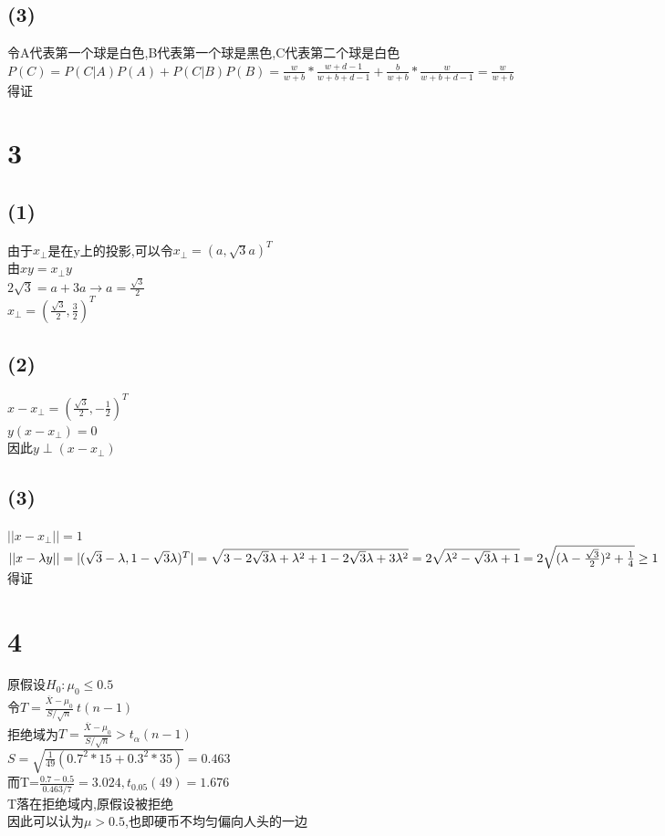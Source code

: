 \documentclass{article}
\begin{document}
\subsection*{(3)}\noindent
令A代表第一个球是白色,B代表第一个球是黑色,C代表第二个球是白色
$P(C)=P(C|A)P(A)+P(C|B)P(B)=\frac{w}{w+b}*\frac{w+d-1}{w+b+d-1}+\frac{b}{w+b}*\frac{w}{w+b+d-1}=\frac{w}{w+b}$\\
得证
\section*{3}\noindent
\subsection*{(1)}\noindent
由于$x_\perp$是在y上的投影,可以令$x_\perp=(a,\sqrt{3}a)^T$\\
由$xy=x_\perp y$\\
$2\sqrt{3}=a+3a\rightarrow a=\frac{\sqrt{3}}{2}$\\
$x_\perp=(\frac{\sqrt{3}}{2},\frac{3}{2})^T$
\subsection*{(2)}\noindent
$x-x_\perp=(\frac{\sqrt{3}}{2},-\frac{1}{2})^T$\\
$y(x-x_\perp)=0$\\
因此$y\perp(x-x_\perp)$
\subsection*{(3)}\noindent
$||x-x_\perp||=1$\\
$||x-\lambda y||=|(\sqrt{3}-\lambda,1-\sqrt{3}\lambda)^T|=\sqrt{3-2\sqrt{3}\lambda+\lambda^2+1-2\sqrt{3}\lambda+3\lambda^2}
\\=2\sqrt{\lambda^2-\sqrt{3}\lambda+1}=2\sqrt{(\lambda-\frac{\sqrt{3}}{2})^2+\frac{1}{4}}\ge 1$\\
得证
\section*{4}\noindent
原假设$H_0:\mu_0\le0.5$\\
令$T=\frac{\overline{X}-\mu_0}{S/\sqrt{n}}~t(n-1)$\\
拒绝域为$T=\frac{\overline{X}-\mu_0}{S/\sqrt{n}}>t_\alpha(n-1)$\\
$S=\sqrt{\frac{1}{49}(0.7^2*15+0.3^2*35)}=0.463$\\
而T=$\frac{0.7-0.5}{0.463/7}=3.024,t_0.05(49)=1.676$\\
T落在拒绝域内,原假设被拒绝\\
因此可以认为$\mu>0.5$,也即硬币不均匀偏向人头的一边
\end{document}
